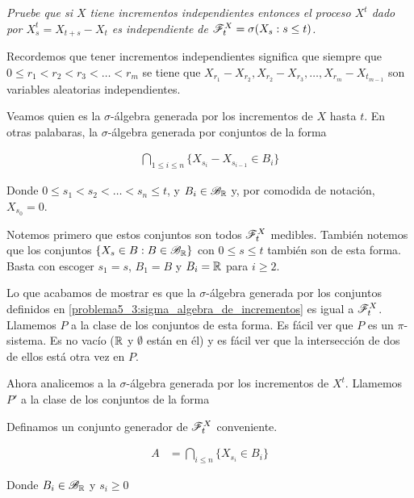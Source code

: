 \emph{
	Pruebe que si $X$ tiene incrementos independientes entonces el proceso $X^t$ dado por $X^t_s=X_{t+s}-X_t$ 
	es independiente de $\mathscr{F}^X_t=\sigma\!\left( X_s : s \leq t\right) $.
}

\afterstatement\pn

Recordemos que tener incrementos independientes significa que siempre que $0 \leq r_1 < r_2 < r_3 < \dots < r_m$ 
se tiene que $X_{r_1} - X_{r_2}, X_{r_2} - X_{r_3}, \dots, X_{r_m} - X_{t_{m-1}}$ son variables aleatorias independientes.\pn

Veamos quien es la $\sigma$-álgebra generada por los incrementos de $X$ hasta $t$. En otras palabaras, la 
$\sigma$-álgebra generada por conjuntos de la forma

\begin{align}
    \bigcap_{1 \leq i \leq n} \{ X_{s_i} - X_{s_{i-1}} \in B_i \} \label{problema5_3:sigma_algebra_de_incrementos}
\end{align}\pn

Donde $0 \leq s_1 < s_2 < \dots < s_n \leq t$, y $B_i \in \mathscr{B}_{\mathbb{R}}$ y, por comodida de notación, $X_{s_{0}} = 0$.\pn 

Notemos primero que estos conjuntos son todos $\mathscr{F}_t^X$ medibles. También notemos que los conjuntos 
$\{ X_s \in B : B \in \mathscr{B}_{\mathbb{R}} \}$ con $0 \leq s \leq t$ también son de esta forma. Basta con escoger 
$s_1 = s$, $B_1 = B$ y $B_i = \mathbb{R}$ para $i \geq 2$.\pn

Lo que acabamos de mostrar es que la $\sigma$-álgebra generada por los conjuntos definidos en \eqref{problema5_3:sigma_algebra_de_incrementos} es
igual a $\mathscr{F}_t^X$. Llamemos $P$ a la clase de los conjuntos de esta forma. Es fácil ver que $P$ es un $\pi$-sistema. Es no vacío 
($\mathbb{R}$ y $\emptyset$ están en él) y es fácil ver que la intersección de dos de ellos está otra vez en $P$.\pn

Ahora analicemos a la $\sigma$-álgebra generada por los incrementos de $X^t$. Llamemos $P'$ a la clase de los conjuntos de la forma



Definamos un conjunto generador de $\mathscr{F}^X_t$ conveniente.\pn

\begin{align}
    A   &= \bigcap_{i \leq n} \{ X_{s_i} \in B_i \}
\end{align}

Donde $B_i \in \mathscr{B}_{\mathbb{R}}$ y $s_i \geq 0$